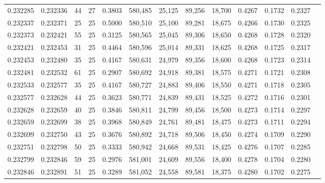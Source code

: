 \begin{tabular}{rrrrrrrrrrrrr}
0.232285 & 0.232336 &    44 &  27 &                                     0.3803 & 580,485 &  25,125 &  89,256 &  18,700 & 0.4267 & 0.1732 & 0.2327 \\
0.232337 & 0.232371 &    25 &  25 &                                     0.5000 & 580,510 &  25,100 &  89,281 &  18,675 & 0.4266 & 0.1730 & 0.2325 \\
0.232373 & 0.232421 &    55 &  25 &                                     0.3125 & 580,565 &  25,045 &  89,306 &  18,650 & 0.4268 & 0.1728 & 0.2320 \\
0.232421 & 0.232453 &    31 &  25 &                                     0.4464 & 580,596 &  25,014 &  89,331 &  18,625 & 0.4268 & 0.1725 & 0.2317 \\
0.232453 & 0.232480 &    35 &  25 &                                     0.4167 & 580,631 &  24,979 &  89,356 &  18,600 & 0.4268 & 0.1723 & 0.2314 \\
0.232481 & 0.232532 &    61 &  25 &                                     0.2907 & 580,692 &  24,918 &  89,381 &  18,575 & 0.4271 & 0.1721 & 0.2308 \\
0.232533 & 0.232577 &    35 &  25 &                                     0.4167 & 580,727 &  24,883 &  89,406 &  18,550 & 0.4271 & 0.1718 & 0.2305 \\
0.232577 & 0.232628 &    44 &  25 &                                     0.3623 & 580,771 &  24,839 &  89,431 &  18,525 & 0.4272 & 0.1716 & 0.2301 \\
0.232628 & 0.232659 &    40 &  25 &                                     0.3846 & 580,811 &  24,799 &  89,456 &  18,500 & 0.4273 & 0.1714 & 0.2297 \\
0.232659 & 0.232699 &    38 &  25 &                                     0.3968 & 580,849 &  24,761 &  89,481 &  18,475 & 0.4273 & 0.1711 & 0.2294 \\
0.232699 & 0.232750 &    43 &  25 &                                     0.3676 & 580,892 &  24,718 &  89,506 &  18,450 & 0.4274 & 0.1709 & 0.2290 \\
0.232751 & 0.232798 &    50 &  25 &                                     0.3333 & 580,942 &  24,668 &  89,531 &  18,425 & 0.4276 & 0.1707 & 0.2285 \\
0.232799 & 0.232846 &    59 &  25 &                                     0.2976 & 581,001 &  24,609 &  89,556 &  18,400 & 0.4278 & 0.1704 & 0.2280 \\
0.232846 & 0.232891 &    51 &  25 &                                     0.3289 & 581,052 &  24,558 &  89,581 &  18,375 & 0.4280 & 0.1702 & 0.2275 \\

\end{tabular}
